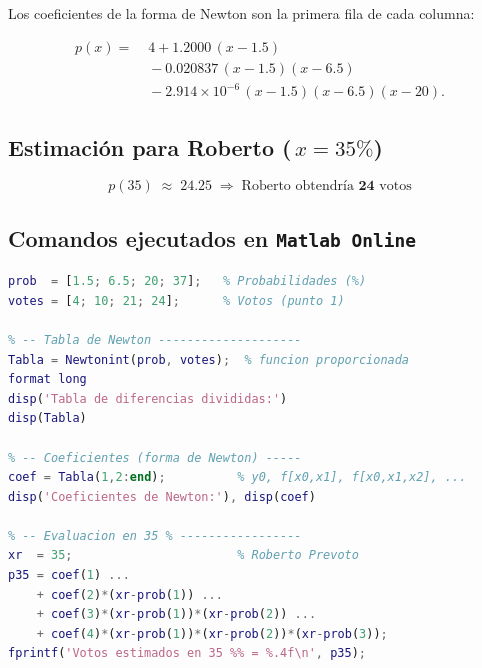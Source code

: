 Los coeficientes de la forma de Newton son la primera fila de cada columna:

\[
\begin{aligned}
p(x)=\;{}&
  4
  + 1.2000\,(x-1.5)\\[2pt]
&{}- 0.020837\,(x-1.5)(x-6.5)\\[2pt]
&{}- 2.914\times10^{-6}\,(x-1.5)(x-6.5)(x-20).
\end{aligned}
\]

\subsection*{Estimación para Roberto (\(\,x=35\%\))}

\[
\boxed{\;p(35)\;\approx\;24.25\;\Longrightarrow\;
       \text{Roberto obtendría } \mathbf{24}\text{ votos}\;}
\]

\subsection*{Comandos ejecutados en \texttt{Matlab Online}}

\begin{lstlisting}[language=Matlab,basicstyle=\ttfamily\small]
% -- Datos ------------------------------
prob  = [1.5; 6.5; 20; 37];   % Probabilidades (%)
votes = [4; 10; 21; 24];      % Votos (punto 1)

% -- Tabla de Newton --------------------
Tabla = Newtonint(prob, votes);  % funcion proporcionada
format long
disp('Tabla de diferencias divididas:')
disp(Tabla)

% -- Coeficientes (forma de Newton) -----
coef = Tabla(1,2:end);          % y0, f[x0,x1], f[x0,x1,x2], ...
disp('Coeficientes de Newton:'), disp(coef)

% -- Evaluacion en 35 % -----------------
xr  = 35;                       % Roberto Prevoto
p35 = coef(1) ...
    + coef(2)*(xr-prob(1)) ...
    + coef(3)*(xr-prob(1))*(xr-prob(2)) ...
    + coef(4)*(xr-prob(1))*(xr-prob(2))*(xr-prob(3));
fprintf('Votos estimados en 35 %% = %.4f\n', p35);
\end{lstlisting}


